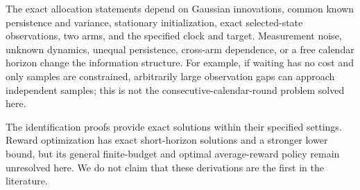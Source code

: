 The exact allocation statements depend on Gaussian innovations, common known persistence and variance, stationary initialization, exact selected-state observations, two arms, and the specified clock and target. Measurement noise, unknown dynamics, unequal persistence, cross-arm dependence, or a free calendar horizon change the information structure. For example, if waiting has no cost and only samples are constrained, arbitrarily large observation gaps can approach independent samples; this is not the consecutive-calendar-round problem solved here.

The identification proofs provide exact solutions within their specified settings. Reward optimization has exact short-horizon solutions and a stronger lower bound, but its general finite-budget and optimal average-reward policy remain unresolved here. We do not claim that these derivations are the first in the literature.

